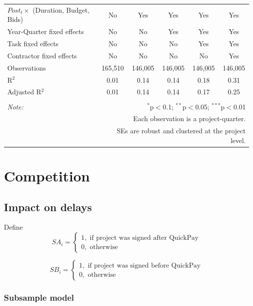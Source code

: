 \documentclass[
]{article}
\begin{document}
\begin{table}[H]
\begin{tabular}{@{\extracolsep{-2pt}}lccccc}
$Post_t \times $  (Duration, Budget, Bids) & No & Yes & Yes & Yes & Yes \\ 
Year-Quarter fixed effects & No & No & Yes & Yes & Yes \\ 
Task fixed effects & No & No & No & Yes & Yes \\ 
Contractor fixed effects & No & No & No & No & Yes \\ 
Observations & 165,510 & 146,005 & 146,005 & 146,005 & 146,005 \\ 
R$^{2}$ & 0.01 & 0.14 & 0.14 & 0.18 & 0.31 \\ 
Adjusted R$^{2}$ & 0.01 & 0.14 & 0.14 & 0.17 & 0.25 \\ 
\hline 
\hline \\[-1.8ex] 
\textit{Note:}  & \multicolumn{5}{r}{$^{*}$p$<$0.1; $^{**}$p$<$0.05; $^{***}$p$<$0.01} \\ 
 & \multicolumn{5}{r}{Each observation is a project-quarter.} \\ 
 & \multicolumn{5}{r}{SEs are robust and clustered at the project level.} \\ 
\end{tabular} 
\end{table}

\hypertarget{competition}{%
\section{Competition}\label{competition}}

\hypertarget{impact-on-delays}{%
\subsection{Impact on delays}\label{impact-on-delays}}

Define
\[ SA_i = \begin{cases} 1, \text{ if project was signed after QuickPay}\\
0, \text{ otherwise} \end{cases}\]

\[ SB_i = \begin{cases} 1, \text{ if project was signed before QuickPay}\\
0, \text{ otherwise} \end{cases}\]

\hypertarget{subsample-model}{%
\subsubsection{Subsample model}\label{subsample-model}}
\end{document}
